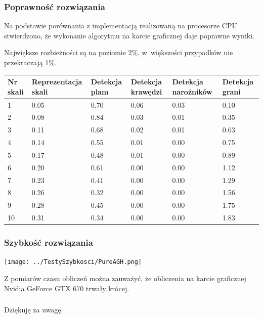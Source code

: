 \begin{frame}
	\frametitle{Poprawność rozwiązania}

	Na podstawie porównania z implementacją realizowaną na procesorze CPU stwierdzono, że wykonanie algorytmu na karcie graficznej daje poprawne wyniki.

	Największe rozbieżności są na poziomie 2\%, w~większości przypadków nie przekraczają 1\%.
	\begin{tiny}
	\begin{table}[h]
\begin{tabular}{|l|l|l|l|l|l|}
\hline
Nr skali & Reprezentacja skali & Detekcja plam & Detekcja krawędzi & Detekcja narożników & Detekcja grani \\ \hline
1        & 0.05                & 0.70          & 0.06              & 0.03                & 0.10           \\ \hline
2        & 0.08                & 0.84          & 0.03              & 0.01                & 0.35           \\ \hline
3        & 0.11                & 0.68          & 0.02              & 0.01                & 0.63           \\ \hline
4        & 0.14                & 0.55          & 0.01              & 0.00                & 0.75           \\ \hline
5        & 0.17                & 0.48          & 0.01              & 0.00                & 0.89           \\ \hline
6        & 0.20                & 0.61          & 0.00              & 0.00                & 1.12           \\ \hline
7        & 0.23                & 0.41          & 0.00              & 0.00                & 1.29           \\ \hline
8        & 0.26                & 0.32          & 0.00              & 0.00                & 1.56           \\ \hline
9        & 0.28                & 0.45          & 0.00              & 0.00                & 1.75           \\ \hline
10       & 0.31                & 0.34          & 0.00              & 0.00                & 1.83           \\ \hline
\end{tabular}
\end{table}
\end{tiny}

\end{frame}
\begin{frame}
	\frametitle{Szybkość rozwiązania}

	\begin{center}
		\texttt{[image: ../TestySzybkosci/PureAGH.png]}
	\end{center}
\tiny{Z pomiarów czasu obliczeń można zauważyć, że obliczenia na karcie graficznej Nvidia GeForce GTX 670 trwały krócej.}

\end{frame}

\begin{frame}
	\frametitle{}
	\begin{center}
		Dziękuję za uwagę.
	\end{center}
\end{frame}
